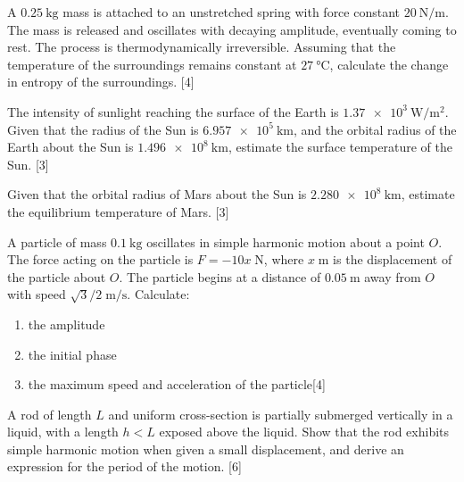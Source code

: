 \begin{problem}
    \begin{subproblem}
        A $\qty{0.25}{\kg}$ mass is attached to an unstretched spring with force constant $\qty{20}{\N\per\m}$. The mass is released and oscillates with decaying amplitude, eventually coming to rest. The process is thermodynamically irreversible. Assuming that the temperature of the surroundings remains constant at $\qty{27}{\degreeCelsius}$, calculate the change in entropy of the surroundings.
    \hfill{[4]}\end{subproblem}
    \begin{subproblem}
        The intensity of sunlight reaching the surface of the Earth is $\qty{1.37e3}{\W\per\square\m}$. Given that the radius of the Sun is $\qty{6.957e5}{\km}$, and the orbital radius of the Earth about the Sun is $\qty{1.496e8}{\km}$, estimate the surface temperature of the Sun.
    \hfill{[3]}\end{subproblem}
    \begin{subproblem}
        Given that the orbital radius of Mars about the Sun is $\qty{2.280e8}{\km}$, estimate the equilibrium temperature of Mars. 
    \hfill{[3]}\end{subproblem}
\end{problem}

\begin{problem}
    \begin{subproblem}
        A particle of mass $\qty{0.1}{\kg}$ oscillates in simple harmonic motion about a point $O$. The force acting on the particle is $F=-10 x\;\unit{\N}$, where $x\;\unit{\m}$ is the displacement of the particle about $O$. The particle begins at a distance of $\qty{0.05}{\m}$ away from $O$ with speed $\sqrt{3}/2\;\unit{\m\per\s}$. Calculate:
        \renewcommand{\theenumi}{(\alph{enumi})}
        \begin{enumerate}
            \item the amplitude
            \item the initial phase
            \item the maximum speed and acceleration of the particle\hfill{[4]}
        \end{enumerate}
    \end{subproblem}
    \begin{subproblem}
        A rod of length $L$ and uniform cross-section is partially submerged vertically in a liquid, with a length $h<L$ exposed above the liquid. Show that the rod exhibits simple harmonic motion when given a small displacement, and derive an expression for the period of the motion.
    \hfill{[6]}\end{subproblem}
\end{problem}

